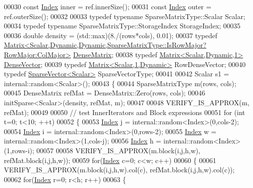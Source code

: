 \begin{DoxyCode}
00030   \textcolor{keyword}{const} \hyperlink{namespace_eigen_a62e77e0933482dafde8fe197d9a2cfde}{Index} inner = ref.innerSize();
00031   \textcolor{keyword}{const} \hyperlink{namespace_eigen_a62e77e0933482dafde8fe197d9a2cfde}{Index} outer = ref.outerSize();
00032 
00033   \textcolor{keyword}{typedef} \textcolor{keyword}{typename} SparseMatrixType::Scalar Scalar;
00034   \textcolor{keyword}{typedef} \textcolor{keyword}{typename} SparseMatrixType::StorageIndex StorageIndex;
00035 
00036   \textcolor{keywordtype}{double} density = (std::max)(8./(rows*cols), 0.01);
00037   \textcolor{keyword}{typedef} 
      \hyperlink{group___core___module_class_eigen_1_1_matrix}{Matrix<Scalar,Dynamic,Dynamic,SparseMatrixType::IsRowMajor?RowMajor:ColMajor>}
       \hyperlink{group___core___module}{DenseMatrix};
00038   \textcolor{keyword}{typedef} \hyperlink{group___core___module}{Matrix<Scalar,Dynamic,1>} \hyperlink{group___core___module}{DenseVector};
00039   \textcolor{keyword}{typedef} \hyperlink{group___core___module_class_eigen_1_1_matrix}{Matrix<Scalar,1,Dynamic>} RowDenseVector;
00040   \textcolor{keyword}{typedef} \hyperlink{group___sparse_core___module_class_eigen_1_1_sparse_vector}{SparseVector<Scalar>} SparseVectorType;
00041 
00042   Scalar s1 = internal::random<Scalar>();
00043   \{
00044     SparseMatrixType m(rows, cols);
00045     DenseMatrix refMat = DenseMatrix::Zero(rows, cols);
00046     initSparse<Scalar>(density, refMat, m);
00047 
00048     VERIFY\_IS\_APPROX(m, refMat);
00049 
00050     \textcolor{comment}{// test InnerIterators and Block expressions}
00051     \textcolor{keywordflow}{for} (\textcolor{keywordtype}{int} t=0; t<10; ++t)
00052     \{
00053       \hyperlink{namespace_eigen_a62e77e0933482dafde8fe197d9a2cfde}{Index} j = internal::random<Index>(0,cols-2);
00054       \hyperlink{namespace_eigen_a62e77e0933482dafde8fe197d9a2cfde}{Index} i = internal::random<Index>(0,rows-2);
00055       \hyperlink{namespace_eigen_a62e77e0933482dafde8fe197d9a2cfde}{Index} w = internal::random<Index>(1,cols-j);
00056       \hyperlink{namespace_eigen_a62e77e0933482dafde8fe197d9a2cfde}{Index} h = internal::random<Index>(1,rows-i);
00057 
00058       VERIFY\_IS\_APPROX(m.block(i,j,h,w), refMat.block(i,j,h,w));
00059       \textcolor{keywordflow}{for}(\hyperlink{namespace_eigen_a62e77e0933482dafde8fe197d9a2cfde}{Index} c=0; c<w; c++)
00060       \{
00061         VERIFY\_IS\_APPROX(m.block(i,j,h,w).col(c), refMat.block(i,j,h,w).col(c));
00062         \textcolor{keywordflow}{for}(\hyperlink{namespace_eigen_a62e77e0933482dafde8fe197d9a2cfde}{Index} r=0; r<h; r++)
00063         \{

\end{DoxyCode}
